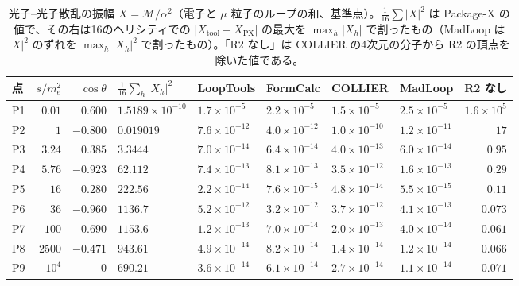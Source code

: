 \documentclass[a4paper,10pt]{ltjsarticle}
\begin{document}
\begin{table}[tbp]
\centering\small
\caption{光子--光子散乱の振幅 $X=\mathcal M/\alpha^2$（電子と $\mu$ 粒子のループの和、基準点）。$\frac1{16}\sum|X|^2$ は Package-X の値で、その右は16のヘリシティでの $|X_{\mathrm{tool}}-X_{\mathrm{PX}}|$ の最大を $\max_h|X_h|$ で割ったもの（MadLoop は $|X|^2$ のずれを $\max_h|X_h|^2$ で割ったもの）。「R2 なし」は COLLIER の4次元の分子から R2 の頂点を除いた値である。}
\label{tab:lbl}
\footnotesize\setlength{\tabcolsep}{4pt}
\begin{tabular}{lrrlllllr}
\toprule
点 & $s/m_e^2$ & $\cos\theta$ & $\frac1{16}\sum_h|X_h|^2$ & LoopTools & FormCalc & COLLIER & MadLoop & R2 なし \\
\midrule
P1 & $0.01$ & $0.600$ & $1.5189\times10^{-10}$ & $1.7\times10^{-5}$ & $2.2\times10^{-5}$ & $1.5\times10^{-5}$ & $2.5\times10^{-5}$ & $1.6\times10^{5}$ \\
P2 & $1$ & $-0.800$ & $0.019019$ & $7.6\times10^{-12}$ & $4.0\times10^{-12}$ & $1.0\times10^{-10}$ & $1.2\times10^{-11}$ & $17$ \\
P3 & $3.24$ & $0.385$ & $3.3444$ & $7.0\times10^{-14}$ & $6.4\times10^{-14}$ & $4.0\times10^{-13}$ & $6.0\times10^{-14}$ & $0.95$ \\
P4 & $5.76$ & $-0.923$ & $62.112$ & $7.4\times10^{-13}$ & $8.1\times10^{-13}$ & $3.5\times10^{-12}$ & $1.6\times10^{-13}$ & $0.29$ \\
P5 & $16$ & $0.280$ & $222.56$ & $2.2\times10^{-14}$ & $7.6\times10^{-15}$ & $4.8\times10^{-14}$ & $5.5\times10^{-15}$ & $0.11$ \\
P6 & $36$ & $-0.960$ & $1136.7$ & $5.2\times10^{-12}$ & $3.2\times10^{-12}$ & $3.7\times10^{-12}$ & $4.1\times10^{-13}$ & $0.073$ \\
P7 & $100$ & $0.690$ & $1153.6$ & $1.2\times10^{-13}$ & $7.0\times10^{-14}$ & $2.0\times10^{-13}$ & $4.0\times10^{-14}$ & $0.061$ \\
P8 & $2500$ & $-0.471$ & $943.61$ & $4.9\times10^{-14}$ & $8.2\times10^{-14}$ & $1.4\times10^{-14}$ & $1.2\times10^{-14}$ & $0.066$ \\
P9 & $10^4$ & $0$ & $690.21$ & $3.6\times10^{-14}$ & $6.1\times10^{-14}$ & $2.7\times10^{-14}$ & $1.1\times10^{-14}$ & $0.071$ \\
\bottomrule
\end{tabular}
\end{table}
\end{document}

